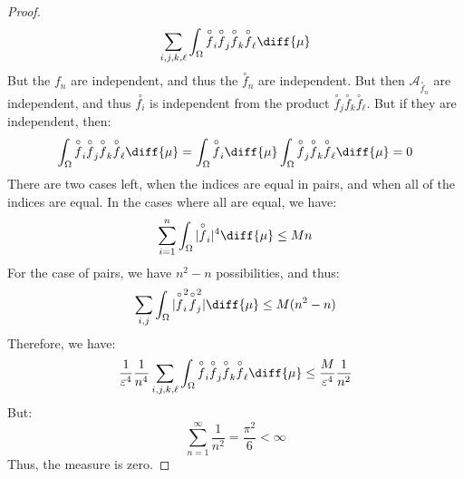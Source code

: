 \begin{proof}
\begin{equation}
                    \sum_{i,j,k,\ell}\int_{\Omega}
                    \overset{\circ}{f}_{i}\overset{\circ}{f}_{j}
                    \overset{\circ}{f}_{k}\overset{\circ}{f}_{\ell}
                    \diff{\mu}
                \end{equation}
                But the $f_{n}$ are independent, and thus the
                $\overset{\circ}{f}_{n}$ are independent. But then
                $\mathcal{A}_{\overset{\circ}{f}_{n}}$ are independent,
                and thus $\overset{\circ}{f_{i}}$ is independent
                from the product
                $\overset{\circ}{f}_{j}\overset{\circ}{f}_{k}\overset{\circ}{f}_{\ell}$. But if they are independent, then:
                \begin{equation}
                    \int_{\Omega}
                    \overset{\circ}{f}_{i}\overset{\circ}{f}_{j}
                    \overset{\circ}{f}_{k}\overset{\circ}{f}_{\ell}
                    \diff{\mu}=
                    \int_{\Omega}
                    \overset{\circ}{f}_{i}\diff{\mu}
                    \int_{\Omega}\overset{\circ}{f}_{j}
                    \overset{\circ}{f}_{k}\overset{\circ}{f}_{\ell}
                    \diff{\mu}=0
                \end{equation}
                There are two cases left, when the indices are equal
                in pairs, and when all of the indices are equal. In
                the cases where all are equal, we have:
                \begin{equation}
                    \sum_{i=1}^{n}
                    \int_{\Omega}
                    |\overset{\circ}{f}_{i}|^{4}\diff{\mu}
                    \leq{M}n
                \end{equation}
                For the case of pairs, we have $n^{2}-n$ possibilities,
                and thus:
                \begin{equation}
                    \sum_{i,j}\int_{\Omega}
                    |\overset{\circ}{f}_{i}^{2}
                    \overset{\circ}{f}_{j}^{2}|\diff{\mu}
                    \leq{M}(n^{2}-n)
                \end{equation}
                Therefore, we have:
                \begin{equation}
                    \frac{1}{\varepsilon^{4}}\frac{1}{n^{4}}
                    \sum_{i,j,k,\ell}\int_{\Omega}
                    \overset{\circ}{f}_{i}\overset{\circ}{f}_{j}
                    \overset{\circ}{f}_{k}\overset{\circ}{f}_{\ell}
                    \diff{\mu}
                    \leq\frac{M}{\varepsilon^{4}}
                    \frac{1}{n^{2}}
                \end{equation}
                But:
                \begin{equation}
                    \sum_{n=1}^{\infty}\frac{1}{n^{2}}
                    =\frac{\pi^{2}}{6}<\infty
                \end{equation}
                Thus, the measure is zero.
            \end{proof}
